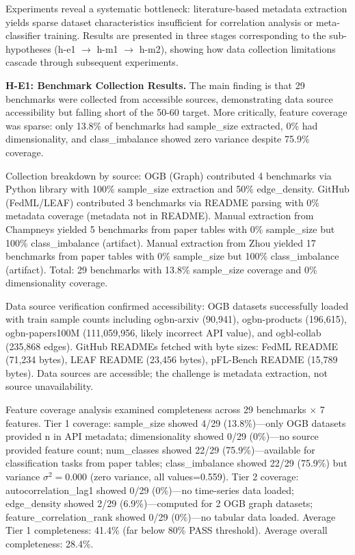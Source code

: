 
Experiments reveal a systematic bottleneck: literature-based metadata extraction yields sparse dataset characteristics insufficient for correlation analysis or meta-classifier training. Results are presented in three stages corresponding to the sub-hypotheses (h-e1 $\rightarrow$ h-m1 $\rightarrow$ h-m2), showing how data collection limitations cascade through subsequent experiments.

\textbf{H-E1: Benchmark Collection Results.} The main finding is that 29 benchmarks were collected from accessible sources, demonstrating data source accessibility but falling short of the 50-60 target. More critically, feature coverage was sparse: only 13.8\% of benchmarks had sample\_size extracted, 0\% had dimensionality, and class\_imbalance showed zero variance despite 75.9\% coverage.

Collection breakdown by source: OGB (Graph) contributed 4 benchmarks via Python library with 100\% sample\_size extraction and 50\% edge\_density. GitHub (FedML/LEAF) contributed 3 benchmarks via README parsing with 0\% metadata coverage (metadata not in README). Manual extraction from Champneys yielded 5 benchmarks from paper tables with 0\% sample\_size but 100\% class\_imbalance (artifact). Manual extraction from Zhou yielded 17 benchmarks from paper tables with 0\% sample\_size but 100\% class\_imbalance (artifact). Total: 29 benchmarks with 13.8\% sample\_size coverage and 0\% dimensionality coverage.

Data source verification confirmed accessibility: OGB datasets successfully loaded with train sample counts including ogbn-arxiv (90,941), ogbn-products (196,615), ogbn-papers100M (111,059,956, likely incorrect API value), and ogbl-collab (235,868 edges). GitHub READMEs fetched with byte sizes: FedML README (71,234 bytes), LEAF README (23,456 bytes), pFL-Bench README (15,789 bytes). Data sources are accessible; the challenge is metadata extraction, not source unavailability.

Feature coverage analysis examined completeness across 29 benchmarks $\times$ 7 features. Tier 1 coverage: sample\_size showed 4/29 (13.8\%)---only OGB datasets provided n in API metadata; dimensionality showed 0/29 (0\%)---no source provided feature count; num\_classes showed 22/29 (75.9\%)---available for classification tasks from paper tables; class\_imbalance showed 22/29 (75.9\%) but variance $\sigma ^{2}=0.000$ (zero variance, all values=0.559). Tier 2 coverage: autocorrelation\_lag1 showed 0/29 (0\%)---no time-series data loaded; edge\_density showed 2/29 (6.9\%)---computed for 2 OGB graph datasets; feature\_correlation\_rank showed 0/29 (0\%)---no tabular data loaded. Average Tier 1 completeness: 41.4\% (far below 80\% PASS threshold). Average overall completeness: 28.4\%.

